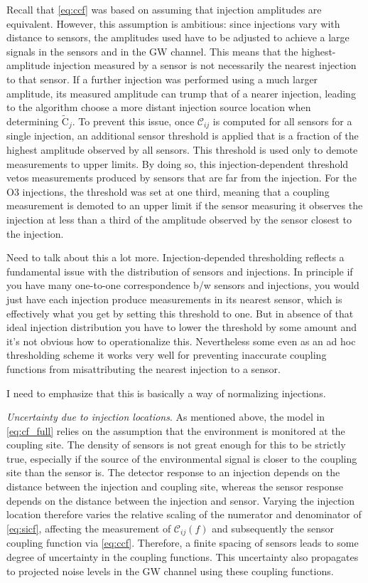 Recall that \cref{eq:ccf} was based on assuming that injection amplitudes are equivalent.
However, this assumption is ambitious: since injections vary with distance to sensors, the amplitudes used have to be adjusted to achieve a large signals in the sensors and in the \ac{GW} channel.
This means that the highest-amplitude injection measured by a sensor is not necessarily the nearest injection to that sensor.
If a further injection was performed using a much larger amplitude, its measured amplitude can trump that of a nearer injection, leading to the algorithm choose a more distant injection source location when determining $\widetilde{\mathrm{C}}_j$.
To prevent this issue, once $\mathcal{C}_{ij}$ is computed for all sensors for a single injection, an additional sensor threshold is applied that is a fraction of the highest amplitude observed by all sensors.
This threshold is used only to demote measurements to upper limits.
By doing so, this injection-dependent threshold vetos measurements produced by sensors that are far from the injection.
For the \ac{O3} injections, the threshold was set at one third, meaning that a coupling measurement is demoted to an upper limit if the sensor measuring it observes the injection at less than a third of the amplitude observed by the sensor closest to the injection.

{\color{red}
Need to talk about this a lot more.
Injection-depended thresholding reflects a fundamental issue with the distribution of sensors and injections.
In principle if you have many one-to-one correspondence b/w sensors and injections,
you would just have each injection produce measurements in its nearest sensor, which is effectively what you get by setting this threshold to one.
But in absence of that ideal injection distribution you have to lower the threshold by some amount and it's not obvious how to operationalize this.
Nevertheless some even as an ad hoc thresholding scheme it works very well for preventing inaccurate coupling functions from misattributing the nearest injection to a sensor.

I need to emphasize that this is basically a way of normalizing injections.}

\textit{Uncertainty due to injection locations}.
As mentioned above, the model in \cref{eq:cf_full} relies on the assumption that the environment is monitored at the coupling site.
The density of sensors is not great enough for this to be strictly true, especially if the source of the environmental signal is closer to the coupling site than the sensor is.
The detector response to an injection depends on the distance between the injection and coupling site, whereas the sensor response depends on the distance between the injection and sensor.
Varying the injection location therefore varies the relative scaling of the numerator and denominator of \cref{eq:sicf}, affecting the measurement of $\mathcal{C}_{ij}(f)$ and subsequently the sensor coupling function via \cref{eq:ccf}.
Therefore, a finite spacing of sensors leads to some degree of uncertainty in the coupling functions.
This uncertainty also propagates to projected noise levels in the \ac{GW} channel using these coupling functions.


